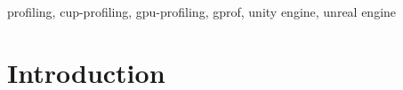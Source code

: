
%
%
%
%
%
%
%
%

\begin{abstract}
Profiling is a integral part of developing any performance critical programs. Various IDEs, Editors and other third party programs offer profilers. This paper introduces and evaluates the profilers of some of the industries biggest IDEs, Engines and Hardware Manufacturers.
\end{abstract}
\begin{keywords}
profiling, cup-profiling, gpu-profiling, gprof, unity engine, unreal engine 
\end{keywords}

\section{Introduction} \label{sec:Introduction}%

